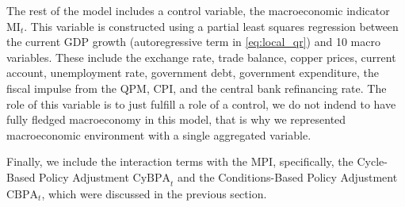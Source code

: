 The rest of the model includes a control variable, the macroeconomic indicator $\text{MI}_t$. This variable is constructed using a partial least squares regression between the current GDP growth (autoregressive term in \autoref{eq:local_qr}) and 10 macro variables. These include the exchange rate, trade balance, copper prices, current account, unemployment rate, government debt, government expenditure, the fiscal impulse from the QPM, CPI, and the central bank refinancing rate. The role of this variable is to just fulfill a role of a control, we do not indend to have fully fledged macroeconomy in this model, that is why we represented macroeconomic environment with a single aggregated variable.

Finally, we include the interaction terms with the MPI, specifically, the Cycle-Based Policy Adjustment $\text{CyBPA}_t$ and the Conditions-Based Policy Adjustment $\text{CBPA}_t$, which were discussed in the previous section.

